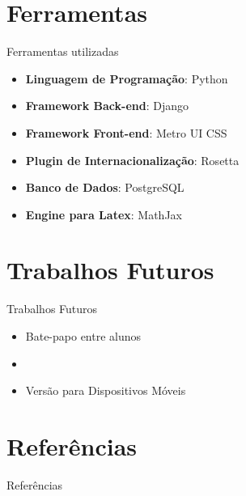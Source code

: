 \documentclass[10pt]{beamer}
\begin{document}
\section{Ferramentas}

\begin{frame}{Ferramentas utilizadas}

\begin{itemize}
	\item \textbf{Linguagem de Programa\c{c}\~ao}: Python
	\item \textbf{Framework Back-end}: Django
	\item \textbf{Framework Front-end}: Metro UI CSS
	\item \textbf{Plugin de Internacionaliza\c{c}\~ao}: Rosetta
	\item \textbf{Banco de Dados}: PostgreSQL
	\item \textbf{Engine para Latex}: MathJax
\end{itemize}

\end{frame}

\section{Trabalhos Futuros}

\begin{frame}{Trabalhos Futuros}

\begin{itemize}
	\item Bate-papo entre alunos
	\item 
	\item Vers\~ao para Dispositivos M\'oveis
\end{itemize}

\end{frame}

\section{Refer\^encias}
\begin{frame}[allowframebreaks]{Refer\^encias}
  
\end{frame}
\end{document}
